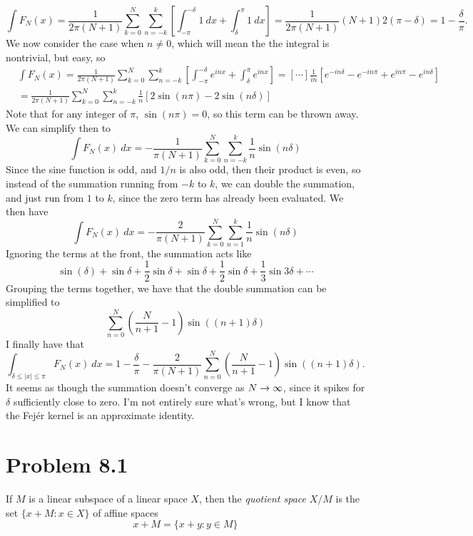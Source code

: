 \begin{solution}
    \[\int F_N(x) = \frac{1}{2\pi(N+1)}\sum_{k = 0}^N\sum_{n = -k}^k \left[\int_{-\pi}^{-\delta} 1 \ dx + \int_{\delta}^\pi 1 \ dx \right]= \frac{1}{2\pi(N+1)} (N+1) 2(\pi - \delta) = 1 - \frac{\delta}{\pi}.\]
    We now consider the case when $n \neq 0$, which will mean the the integral is nontrivial, but easy, so
    \begin{align*}
        &\int F_N(x) = \frac{1}{2\pi(N+1)}\sum_{k = 0}^N\sum_{n = -k}^k \left[\int_{-\pi}^{-\delta} e^{inx}+ \int_{\delta}^\pi e^{inx} \right]= \left[\cdots\right] \frac{1}{in}\left[ e^{-in\delta} - e^{-in\pi} + e^{in\pi} - e^{in\delta}\right]\\
        &= \frac{1}{2\pi(N+1)}\sum_{k = 0}^N\sum_{n = -k}^k \frac{1}{n}\left[ 2\sin(n\pi) - 2\sin(n\delta)\right]
    \end{align*}
    Note that for any integer of $\pi$, $\sin(n\pi) =0$, so this term can be thrown away. We can simplify then to
    \[\int F_N(x) \ dx = -\frac{1}{\pi(N+1)}\sum_{k = 0}^N\sum_{n = -k}^k \frac{1}{n}\sin(n\delta)\]
    Since the sine function is odd, and $1/n$ is also odd, then their product is even, so instead of the summation running from $-k$ to $k$, we can double the summation, and just run from $1$ to $k$, since the zero term has already been evaluated. We then have 
    \[\int F_N(x) \ dx = -\frac{2}{\pi(N+1)}\sum_{k = 0}^N\sum_{n = 1}^k \frac{1}{n}\sin(n\delta)\]
    Ignoring the terms at the front, the summation acts like 
    \[\sin(\delta) + \sin{\delta} + \frac{1}{2}\sin{\delta} + \sin{\delta} + \frac{1}{2}\sin{\delta} +\frac{1}{3}\sin{3\delta} + \cdots \]
    Grouping the terms together, we have that the double summation can be simplified to  
    \[\sum_{n = 0}^N \left( \frac{N}{n+1}  -1\right)\sin((n+1)\delta)\]
    I finally have that
    \[\int_{\delta \leq |x| \leq \pi} F_N(x) \ dx = 1 - \frac{\delta}{\pi} - \frac{2}{\pi(N+1)}\sum_{n = 0}^N \left( \frac{N}{n+1}  -1\right)\sin((n+1)\delta). \]
    It seems as though the summation doesn't converge as $N \rightarrow \infty$, since it spikes for $\delta$ sufficiently close to zero. I'm not entirely sure what's wrong, but I know that the Fej\'er kernel is an approximate identity. 
\end{solution}

\newpage
\section{Problem 8.1}
If $M$ is a linear subspace of a linear space $X$, then the \textit{quotient space} $X/M$ is the set $\{ x + M : x \in X\}$ of affine spaces
\[x + M = \{x + y : y \in M\}\]


